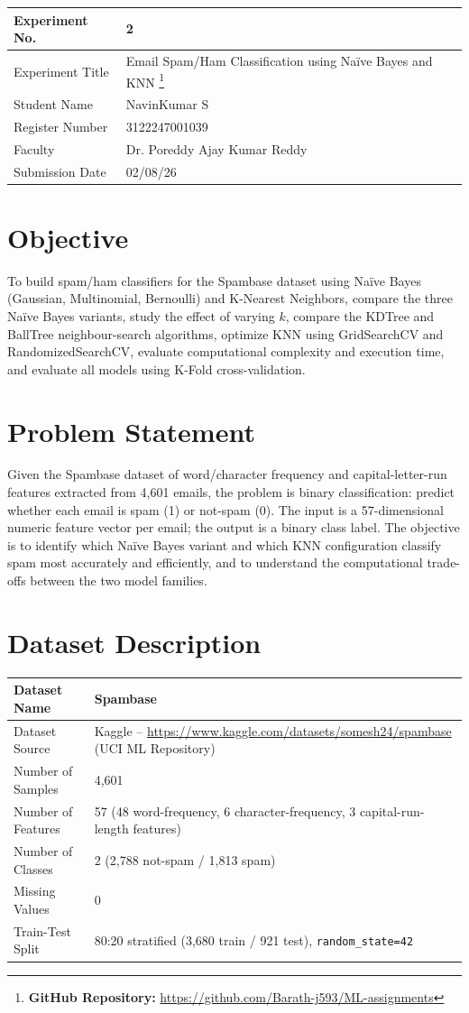 \documentclass[12pt,a4paper]{article}
\begin{document}
\begin{tabular}{|p{4cm}|p{11cm}|}
\hline
Experiment No. & 2 \\ \hline
Experiment Title & Email Spam/Ham Classification using Na\"ive Bayes and KNN
\footnote{\textbf{GitHub Repository: }\url{https://github.com/Barath-j593/ML-assignments}}\\ \hline
Student Name & NavinKumar S \\ \hline
Register Number & 3122247001039\\ \hline
Faculty & Dr. Poreddy Ajay Kumar Reddy \\ \hline
Submission Date & 02/08/26 \\ \hline
\end{tabular}

\section{Objective}
To build spam/ham classifiers for the Spambase dataset using Na\"ive Bayes (Gaussian,
Multinomial, Bernoulli) and K-Nearest Neighbors, compare the three Na\"ive Bayes variants,
study the effect of varying $k$, compare the KDTree and BallTree neighbour-search algorithms,
optimize KNN using GridSearchCV and RandomizedSearchCV, evaluate computational complexity and
execution time, and evaluate all models using K-Fold cross-validation.

\section{Problem Statement}
Given the Spambase dataset of word/character frequency and capital-letter-run features
extracted from 4,601 emails, the problem is binary classification: predict whether each email
is spam (1) or not-spam (0). The input is a 57-dimensional numeric feature vector per email;
the output is a binary class label. The objective is to identify which Na\"ive Bayes variant
and which KNN configuration classify spam most accurately and efficiently, and to understand
the computational trade-offs between the two model families.

\section{Dataset Description}
\begin{longtable}{|p{6cm}|p{8cm}|}
\hline
Dataset Name & Spambase \\ \hline
Dataset Source & Kaggle -- \url{https://www.kaggle.com/datasets/somesh24/spambase} (UCI ML Repository) \\ \hline
Number of Samples & 4,601 \\ \hline
Number of Features & 57 (48 word-frequency, 6 character-frequency, 3 capital-run-length features) \\ \hline
Number of Classes & 2 (2,788 not-spam / 1,813 spam) \\ \hline
Missing Values & 0 \\ \hline
Train-Test Split & 80:20 stratified (3,680 train / 921 test), \texttt{random\_state=42} \\ \hline
\end{longtable}
\end{document}
